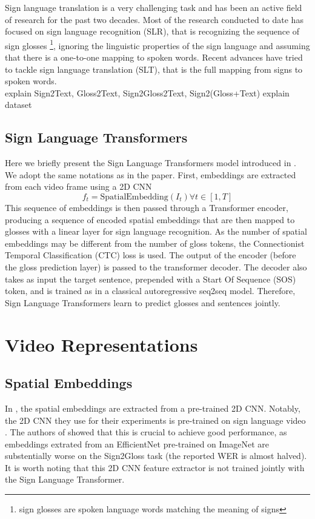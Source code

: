 \documentclass[final]{cvpr}
\begin{document}
Sign language translation is a very challenging task and has been an active field of
research for the past two decades. Most of the research conducted to date has focused on sign language recognition (SLR), that is recognizing the sequence of sign glosses \footnote{sign glosses are spoken language words matching the meaning of signs}, ignoring the linguistic properties of the sign language and assuming that there is a one-to-one mapping to spoken words. Recent advances have tried to tackle sign language translation (SLT), that is the full mapping from signs to spoken words.
\\
explain Sign2Text, Gloss2Text, Sign2Gloss2Text, Sign2(Gloss+Text)
explain dataset
\subsection{Sign Language Transformers}
Here we briefly present the Sign Language Transformers model introduced in \cite{neccam}. We adopt the same notations as in the paper. First, embeddings are extracted from each video frame using a 2D CNN
$$f_{t}= \text{SpatialEmbedding} \left(I_{t}\right) \forall t\in[1, T]$$
This sequence of embeddings is then passed through a Transformer encoder, producing a sequence of encoded spatial embeddings that are then mapped to glosses with a linear layer for sign language recognition. As the number of spatial embeddings may be different from the number of gloss tokens, the Connectionist Temporal Classification (CTC) loss is used. The output of the encoder (before the gloss prediction layer) is passed to the transformer decoder. The decoder also takes as input the target sentence, prepended with a Start Of Sequence (SOS) token, and is trained as in a classical autoregressive seq2seq model. Therefore, Sign Language Transformers learn to predict glosses and sentences jointly.


\section{Video Representations}
\subsection{Spatial Embeddings}

In \cite{neccam}, the spatial embeddings are extracted from a pre-trained 2D CNN. Notably, the 2D CNN they use for their experiments is pre-trained on sign language video \cite{hmm}. The authors of \cite{neccam} showed that this is crucial to achieve good performance, as embeddings extrated from an EfficientNet \cite{effnet} pre-trained on ImageNet are substentially worse on the Sign2Gloss task (the reported WER is almost halved).
It is worth noting that this 2D CNN feature extractor is not trained jointly with the Sign Language Transformer.
\end{document}
